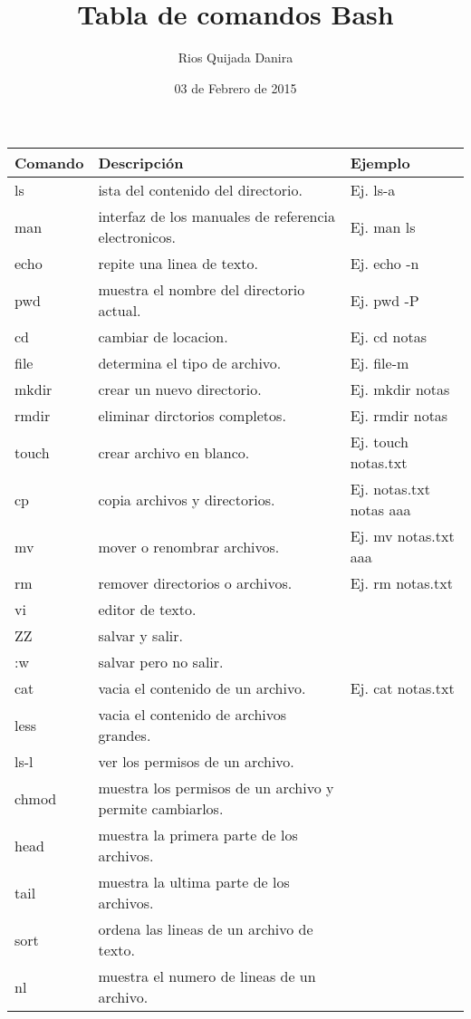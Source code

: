 \documentclass[10pt]{article}
\title{Tabla de comandos Bash}
\author{Rios Quijada Danira}
\date{03 de Febrero de 2015}
\begin{document}
\maketitle
\begin{tabular}{||l|l|l||}
\hline \hline
Comando & Descripción & Ejemplo \\
\hline
ls & ista del contenido del directorio. & Ej. ls-a \\ \hline
man & interfaz de los manuales de referencia electronicos. & Ej. man ls \\ \hline
echo & repite una linea de texto. & Ej. echo -n \\ \hline
pwd & muestra el nombre del directorio actual. & Ej. pwd -P \\ \hline
cd & cambiar de locacion. & Ej. cd notas \\ \hline
file & determina el tipo de archivo. & Ej. file-m \\ \hline
mkdir &crear un nuevo directorio. & Ej. mkdir notas \\ \hline
rmdir & eliminar dirctorios completos. & Ej. rmdir notas \\ \hline
touch & crear archivo en blanco. & Ej. touch notas.txt \\ \hline
cp & copia archivos y directorios. & Ej. notas.txt notas aaa \\ \hline
mv & mover o renombrar archivos. & Ej. mv notas.txt aaa \\ \hline
rm & remover directorios o archivos. & Ej. rm notas.txt \\ \hline
vi & editor de texto. &  \\ \hline
ZZ & salvar y salir. & \\ \hline
:w & salvar pero no salir.& \\ \hline
cat & vacia el contenido de un archivo. & Ej. cat notas.txt \\ \hline
less & vacia el contenido de archivos grandes. & \\ \hline
ls-l & ver los permisos de un archivo. & \\ \hline
chmod & muestra los permisos de un archivo y permite cambiarlos. & \\ \hline
head & muestra la primera parte de los archivos. & \\ \hline
tail & muestra la ultima parte de los archivos. & \\ \hline
sort & ordena las lineas de un archivo de texto. & \\ \hline
nl & muestra el numero de lineas de un archivo. & \\ \hline

\end{tabular}
\end{document}
